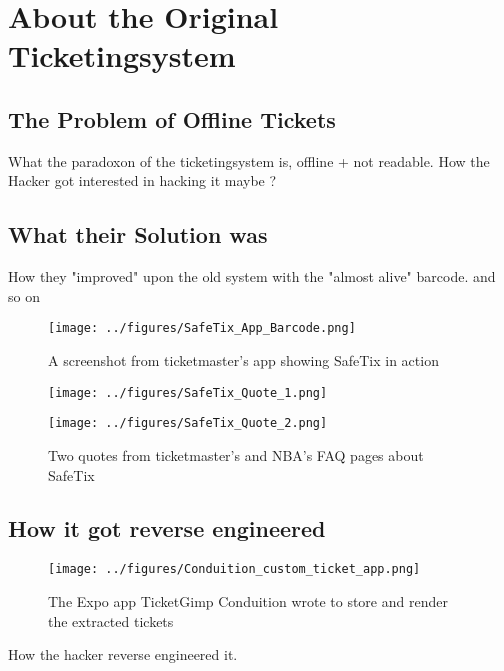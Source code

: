 \section{About the Original Ticketingsystem}

\subsection{The Problem of Offline Tickets}

What the paradoxon of the ticketingsystem is, offline + not readable.
How the Hacker got interested in hacking it maybe ?

\subsection{What their Solution was}
How they "improved" upon the old system with the "almost alive" barcode.
and so on
\begin{figure}[h]
    \begin{center}        
    \texttt{[image: ../figures/SafeTix\_App\_Barcode.png]}
    \caption{A screenshot from ticketmaster's app showing SafeTix in action \cite{ticketmaster_mobile_ticketing}}
    \label{fig:app_barcode}
    \end{center}
\end{figure}
\begin{figure}[h]
    \begin{center}
        \texttt{[image: ../figures/SafeTix\_Quote\_1.png]}
    \end{center}
    \begin{center}
        \texttt{[image: ../figures/SafeTix\_Quote\_2.png]}
    \end{center}
    \caption{Two quotes from ticketmaster's and NBA's FAQ pages about SafeTix \cite{ticketmaster_safetix_faq} \cite{nba_safetix_faq}}
    \label{fig:safetix_quotes}
\end{figure}
\subsection{How it got reverse engineered}
\begin{figure}[h]
    \begin{center}
    \texttt{[image: ../figures/Conduition\_custom\_ticket\_app.png]}
    \caption{The Expo app TicketGimp Conduition wrote to store and render the extracted tickets \cite{reverse_engineering_ticketmaster}}
    \label{fig:conduition_custom_app}
    \end{center}
\end{figure}
How the hacker reverse engineered it.
